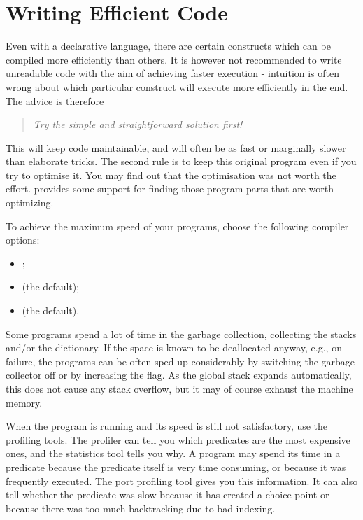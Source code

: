 \section{Writing Efficient Code}
\label{secefficientcode}
Even with a declarative language, there are certain
constructs which can be compiled more efficiently than others.
It is however not recommended to write unreadable code with the aim
of achieving faster execution - intuition is often wrong about which
particular construct will execute more efficiently in the end.
The advice is therefore
\begin{quotation}
        \emph{Try the simple and straightforward solution first!}
\end{quotation}
This will keep code maintainable, and will often be
as fast or marginally slower than elaborate tricks.
The second rule is to keep this original program even if you try
to optimise it. You may find out that the optimisation
was not worth the effort.
{\eclipse} provides some support for finding those program parts
that are worth optimizing.

To achieve the maximum speed of your programs, choose the following compiler
options:
\begin{itemize}
\item {} ;
\item {} (the default);
\item {} (the default).
\end{itemize}
Some programs spend a lot of time in the garbage collection,
collecting the stacks and/or the dictionary.
If the space is known to be deallocated anyway, e.g., on failure,
the programs can be often sped up considerably
by switching the garbage collector off or by increasing
the  flag.
As the global stack expands automatically, this does not cause
any stack overflow, but it may of course exhaust the machine memory.

When the program is running and its speed is still
not satisfactory, use the profiling tools.
The profiler can tell you which predicates
are the most expensive ones, and the statistics tool
tells you why.
A program may spend its time in a predicate because the predicate
itself is very time consuming, or because it was frequently executed.
The port profiling tool gives you this information.
It can also tell whether the predicate was slow because it
has created a choice point or because there was too much
backtracking due to bad indexing.

